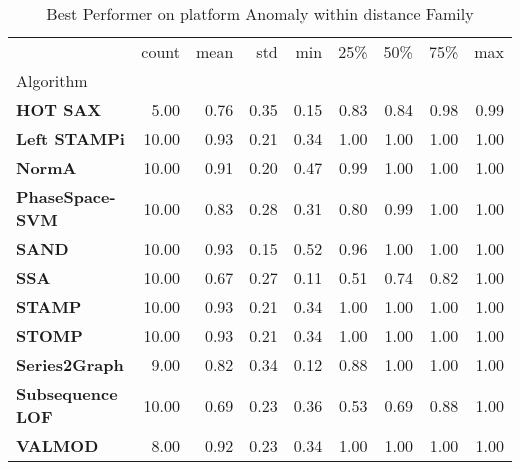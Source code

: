 \begin{table}
\caption{Best Performer on platform Anomaly within distance Family}
\label{tab:bp-platform_distance}
\begin{tabular}{lrrrrrrrr}
\toprule
 & count & mean & std & min & 25\% & 50\% & 75\% & max \\
Algorithm &  &  &  &  &  &  &  &  \\
\midrule
\textbf{HOT SAX} & 5.00 & 0.76 & 0.35 & 0.15 & 0.83 & 0.84 & 0.98 & 0.99 \\
\textbf{Left STAMPi} & 10.00 & 0.93 & 0.21 & 0.34 & 1.00 & 1.00 & 1.00 & 1.00 \\
\textbf{NormA} & 10.00 & 0.91 & 0.20 & 0.47 & 0.99 & 1.00 & 1.00 & 1.00 \\
\textbf{PhaseSpace-SVM} & 10.00 & 0.83 & 0.28 & 0.31 & 0.80 & 0.99 & 1.00 & 1.00 \\
\textbf{SAND} & 10.00 & 0.93 & 0.15 & 0.52 & 0.96 & 1.00 & 1.00 & 1.00 \\
\textbf{SSA} & 10.00 & 0.67 & 0.27 & 0.11 & 0.51 & 0.74 & 0.82 & 1.00 \\
\textbf{STAMP} & 10.00 & 0.93 & 0.21 & 0.34 & 1.00 & 1.00 & 1.00 & 1.00 \\
\textbf{STOMP} & 10.00 & 0.93 & 0.21 & 0.34 & 1.00 & 1.00 & 1.00 & 1.00 \\
\textbf{Series2Graph} & 9.00 & 0.82 & 0.34 & 0.12 & 0.88 & 1.00 & 1.00 & 1.00 \\
\textbf{Subsequence LOF} & 10.00 & 0.69 & 0.23 & 0.36 & 0.53 & 0.69 & 0.88 & 1.00 \\
\textbf{VALMOD} & 8.00 & 0.92 & 0.23 & 0.34 & 1.00 & 1.00 & 1.00 & 1.00 \\
\bottomrule
\end{tabular}
\end{table}
